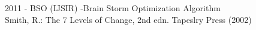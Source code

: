 \newpage
\begin{thebibliography}{9}
	 2011 - BSO (IJSIR) -Brain Storm Optimization Algorithm\\
	
	 Smith, R.: The 7 Levels of Change, 2nd edn. Tapeslry Press (2002)\\
	
\end{thebibliography}








